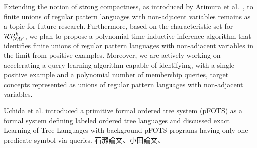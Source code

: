 Extending the notion of strong compactness, as introduced by Arimura et al.~\cite{Arimura1996}, to finite unions of regular pattern languages with non-adjacent variables remains as a topic for future research.
Furthermore, based on the characteristic set for $\mathcal{RP}^{k}_{\!\!\!N\!A\!V}$, we plan to propose a polynomial-time inductive inference algorithm that identifies finite unions of regular pattern languages with non-adjacent variables in the limit from positive examples.
Moreover, we are actively working on accelerating a query learning algorithm capable of identifying, with a single positive example and a polynomial number of membership queries, target concepts represented as unions of regular pattern languages with non-adjacent variables.

Uchida et al. \cite{Uchida2019} introduced a primitive formal ordered tree system (pFOTS) as a formal system defining labeled ordered tree languages and discussed exact Learning of Tree Languages with background pFOTS programs having only one predicate symbol via queries.
石灘論文\cite{Ishinada2023}、小田論文、



